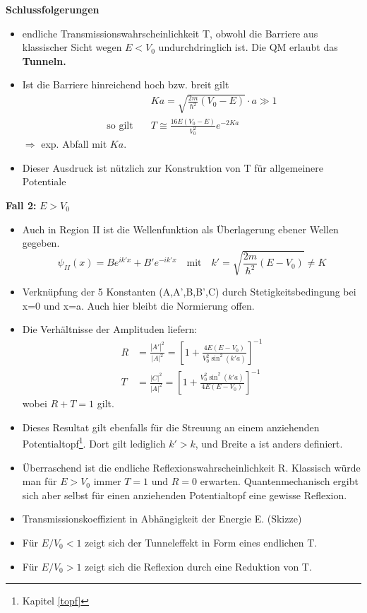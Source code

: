 \documentclass[10pt,article,colorback,accentcolor=tud9d]{scrartcl}
\begin{document}
\textbf{Schlussfolgerungen}
  \begin{itemize}
    \item endliche Transmissionswahrscheinlichkeit T, obwohl die Barriere aus klassischer Sicht wegen $E<V_0$ undurchdringlich ist. Die QM erlaubt das \textbf{Tunneln.}
    \item Ist die Barriere hinreichend hoch bzw. breit gilt
      \begin{align}
      &Ka=\sqrt{\frac{2m}{\hbar^2}(V_0-E)}\cdot a \gg 1\\
      \text{so gilt}\quad &T\cong\frac{16E(V_0-E)}{V_0^2}e^{-2Ka}
      \end{align}
      $\Rightarrow$ exp. Abfall mit $Ka$.
    \item Dieser Ausdruck ist nützlich zur Konstruktion von T für allgemeinere Potentiale
  \end{itemize}
\textbf{Fall 2:} $E>V_0$
  \begin{itemize}
    \item Auch in Region II ist die Wellenfunktion als Überlagerung ebener Wellen gegeben. 
      \begin{equation}
      \psi_{II}(x)=Be^{ik'x}+B'e^{-ik'x} \quad \text{mit}\quad k'=\sqrt{\frac{2m}{\hbar^2}(E-V_0)}\neq K
      \end{equation}
    \item Verknüpfung der 5 Konstanten (A,A',B,B',C) durch Stetigkeitsbedingung bei x=0 und x=a. Auch hier bleibt die Normierung offen.
    \item Die Verhältnisse der Amplituden liefern:
      \begin{align}
      R&=\frac{|A'|^2}{|A|^2}=\left[1+\frac{4E(E-V_0)}{V_0^2\sin^2(k'a)}\right]^{-1}\\
      T&=\frac{|C|^2}{|A|^2}=\left[1+\frac{V_0^2\sin^2(k'a)}{4E(E-V_0)}\right]^{-1}
      \end{align}
      wobei $R+T=1$ gilt.
    \item Dieses Resultat gilt ebenfalls für die Streuung an einem anziehenden Potentialtopf\footnote{Kapitel \ref{topf}}. Dort gilt lediglich $k'>k$, und Breite a ist anders definiert.
    \item Überraschend ist die endliche Reflexionswahrscheinlichkeit R. Klassisch würde man für $E>V_0$ immer $T=1$ und $R=0$ erwarten. Quantenmechanisch ergibt sich aber selbst für einen anziehenden Potentialtopf eine gewisse Reflexion.
    \item Transmissionskoeffizient in Abhängigkeit der Energie E. (Skizze)
    \item Für $E/V_0<1$ zeigt sich der Tunneleffekt in Form eines endlichen T.
    \item Für $E/V_0>1$ zeigt sich die Reflexion durch eine Reduktion von T.
  \end{itemize}
 
\end{document}

